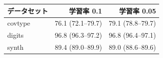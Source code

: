 \begin{tabular}{lrr}
\toprule
データセット & 学習率 0.1 & 学習率 0.05 \\
\midrule
covtype & 76.1 (72.1--79.7) & 79.1 (78.8--79.7) \\
digits & 96.8 (96.3--97.2) & 96.8 (96.4--97.1) \\
synth & 89.4 (89.0--89.9) & 89.0 (88.6--89.6) \\
\bottomrule
\end{tabular}
